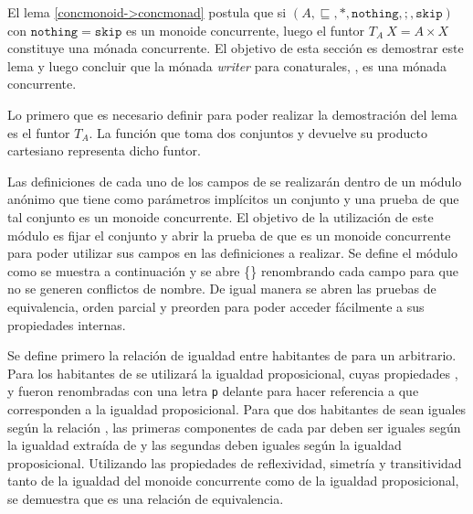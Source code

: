 El lema \ref{concmonoid->concmonad} postula que si $(A,\sqsubseteq,*,\mathtt{nothing},;,\mathtt{skip})$ con $\mathtt{nothing} = \mathtt{skip}$ es un monoide concurrente, luego el funtor $\mathit{T}_A \ X = A \times X$ constituye una mónada concurrente. El objetivo de esta sección es demostrar este lema y luego concluir que la mónada \textit{writer} para conaturales,  , es una mónada concurrente. 

\begin{AgdaAlign}
Lo primero que es necesario definir para poder realizar la demostración del lema es el funtor $\mathit{T}_A$. La función  que toma dos conjuntos y devuelve su producto cartesiano representa dicho funtor.

Las definiciones de cada uno de los campos de  se realizarán dentro de un módulo anónimo que tiene como parámetros implícitos un conjunto  y una prueba  de que tal conjunto es un monoide concurrente. El objetivo de la utilización de este módulo es fijar el conjunto  y abrir la prueba de que es un monoide concurrente para poder utilizar sus campos en las definiciones a realizar. Se define el módulo como se muestra a continuación y se abre  \{\} renombrando cada campo para que no se generen conflictos de nombre. De igual manera se abren las pruebas de equivalencia, orden parcial y preorden para poder acceder fácilmente a sus propiedades internas. 

Se define primero la relación de igualdad entre habitantes de   para un  arbitrario. Para los habitantes de  se utilizará la igualdad proposicional, cuyas propiedades ,  y  fueron renombradas con una letra \texttt{p} delante para hacer referencia a que corresponden a la igualdad proposicional. Para que dos habitantes de    sean iguales según la relación , las primeras componentes de cada par deben ser iguales según la igualdad extraída de  y las segundas deben iguales según la igualdad proposicional. Utilizando las propiedades de reflexividad, simetría y transitividad tanto de la igualdad del monoide concurrente como de la igualdad proposicional, se demuestra que  es una relación de equivalencia.


\end{AgdaAlign}

